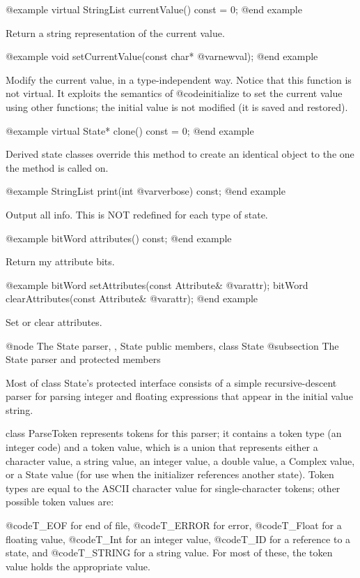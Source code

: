 @example
virtual StringList currentValue() const = 0;
@end example

Return a string representation of the current value.

@example
void setCurrentValue(const char* @var{newval});
@end example

Modify the current value, in a type-independent way.  Notice that this
function is not virtual.  It exploits the semantics of @code{initialize}
to set the current value using other functions; the initial value is
not modified (it is saved and restored).

@example
virtual State* clone() const = 0;
@end example

Derived state classes override this method to create an identical
object to the one the method is called on.

@example
StringList print(int @var{verbose}) const;
@end example

Output all info.  This is NOT redefined for each type of state.

@example
bitWord attributes() const;
@end example

Return my attribute bits.

@example
bitWord setAttributes(const Attribute& @var{attr});
bitWord clearAttributes(const Attribute& @var{attr});
@end example

Set or clear attributes.

@node The State parser,  , State public members, class State
@subsection The State parser and protected members

Most of class State's protected interface consists of a simple
recursive-descent parser for parsing integer and floating expressions
that appear in the initial value string.

class ParseToken represents tokens for this parser; it contains a
token type (an integer code) and a token value, which is a
union that represents either a character value, a string value, an
integer value, a double value, a Complex value, or a State value
(for use when the initializer references another state).  Token
types are equal to the ASCII character value for single-character
tokens; other possible token values are:

@code{T_EOF} for end of file, @code{T_ERROR} for error, @code{T_Float}
for a floating value, @code{T_Int} for an integer value, @code{T_ID}
for a reference to a state, and @code{T_STRING} for a string value.
For most of these, the token value holds the appropriate value.

